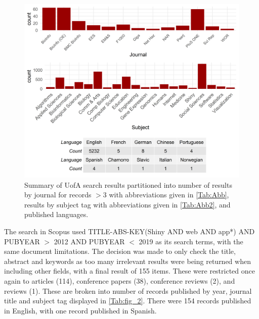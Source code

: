 \begin{figure}[ht]
	\centering
	\includegraphics[width=\textwidth]{3wayUOFA.PNG}
	\caption{Summary of UofA search results partitioned into number of results by journal for records \(> 3\) with abbreviations given in \autoref{Tab:Abb}, results by subject tag with abbreviations given in \autoref{Tab:Abb2}, and published languages.}
	\label{Tab:fig_1}
\end{figure}

The search in Scopus used TITLE-ABS-KEY(Shiny AND web AND app*) AND PUBYEAR \(>\) 2012 AND PUBYEAR \(<\) 2019 as its search terms, with the same document limitations.  The decision was made to only check the title, abstract and keywords as too many irrelevant results were being returned when including other fields, with a final result of 155 items.  These were restricted once again to articles (114), conference papers (38), conference reviews (2), and reviews (1).  These are broken into number of records published by year, journal title and subject tag displayed in \autoref{Tab:fig_2}.  There were 154 records published in English, with one record published in Spanish.


